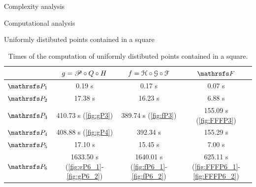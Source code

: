 \documentclass[11pt, a4paper, english, twoside, notitlepage, openright]{report}
\begin{document}
\begin{chapter}{Complexity analysis}
\begin{section}{Computational analysis}
\begin{subsection}{Uniformly distibuted points contained in a square}
\begin{table}[ht!]
\begin{center}
\begin{tabular}{c || c | c | c}
& $g = \P\circ Q \circ H$ & $f=\HH\circ\GG\circ\FF$ & $\FFF$ \\ \hline \hline
$\PP_1$ & 0.19 s & 0.17 s & 0.07 s \\ \hline
$\PP_2$ & 17.38 s & 16.23 s & 6.88 s \\ \hline
$\PP_3$ & 410.73 s (\ref{fig:gP3}) & 389.74 s (\ref{fig:fP3}) & 155.09 s (\ref{fig:FFFP3}) \\ \hline
$\PP_4$ & 408.88 s (\ref{fig:gP4}) & 392.34 s & 155.29 s \\ \hline
$\PP_5$ & 17.10 s & 15.45 s & 7.00 s \\ \hline
$\PP_6$ & 1633.50 s (\ref{fig:gP6_1}-\ref{fig:gP6_2}) & 1640.01 s  (\ref{fig:fP6_1}-\ref{fig:fP6_2}) & 625.11 s  (\ref{fig:FFFP6_1}-\ref{fig:FFFP6_2}) \\
\end{tabular}
\caption[Times of the computation of points contained in a square.]{Times of the computation of uniformly distibuted points contained in a square.}\label{tab:square}
\end{center}
\end{table}


\end{subsection}
\end{section}
\end{chapter}
\end{document}
